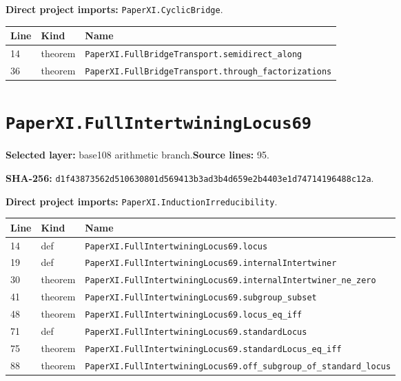 \documentclass[10pt,oneside]{book}
\begin{document}

\textbf{Direct project imports:} \nolinkurl{PaperXI.CyclicBridge}.

\begin{longtable}{@{}p{}p{}p{}@{}}\toprule Line&Kind&Name\\\midrule\endhead

14&theorem&\nolinkurl{PaperXI.FullBridgeTransport.semidirect_along}\\

36&theorem&\nolinkurl{PaperXI.FullBridgeTransport.through_factorizations}\\

\bottomrule\end{longtable}

\section{\texorpdfstring{\nolinkurl{PaperXI.FullIntertwiningLocus69}}{PaperXI.FullIntertwiningLocus69}}\label{module:PaperXI.FullIntertwiningLocus69}

\textbf{Selected layer:} base108 arithmetic branch.\quad\textbf{Source lines:} 95.\par\textbf{SHA-256:} {\scriptsize\nolinkurl{d1f43873562d510630801d569413b3ad3b4d659e2b4403e1d74714196488c12a}}.


\textbf{Direct project imports:} \nolinkurl{PaperXI.InductionIrreducibility}.

\begin{longtable}{@{}p{}p{}p{}@{}}\toprule Line&Kind&Name\\\midrule\endhead

14&def&\nolinkurl{PaperXI.FullIntertwiningLocus69.locus}\\

19&def&\nolinkurl{PaperXI.FullIntertwiningLocus69.internalIntertwiner}\\

30&theorem&\nolinkurl{PaperXI.FullIntertwiningLocus69.internalIntertwiner_ne_zero}\\

41&theorem&\nolinkurl{PaperXI.FullIntertwiningLocus69.subgroup_subset}\\

48&theorem&\nolinkurl{PaperXI.FullIntertwiningLocus69.locus_eq_iff}\\

71&def&\nolinkurl{PaperXI.FullIntertwiningLocus69.standardLocus}\\

75&theorem&\nolinkurl{PaperXI.FullIntertwiningLocus69.standardLocus_eq_iff}\\

88&theorem&\nolinkurl{PaperXI.FullIntertwiningLocus69.off_subgroup_of_standard_locus}\\

\bottomrule\end{longtable}
\end{document}
